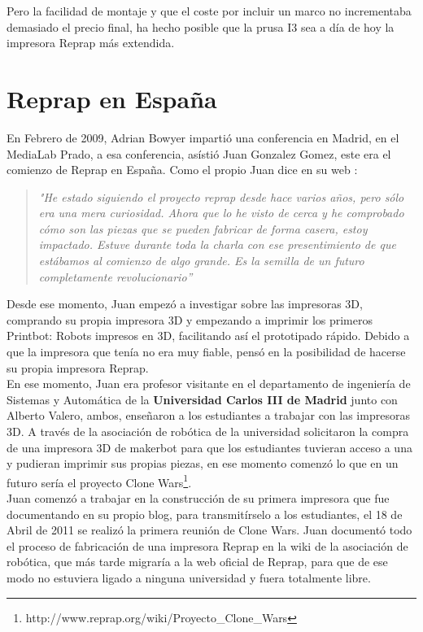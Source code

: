 Pero la facilidad de montaje y que el coste por incluir un marco no incrementaba demasiado el precio final, ha hecho posible que la prusa I3 sea a día de hoy la impresora Reprap más extendida.

\section{Reprap en España}

En Febrero de 2009, Adrian Bowyer impartió una conferencia en Madrid, en el MediaLab Prado, a esa conferencia, asístió Juan Gonzalez Gomez, este era el comienzo de Reprap en España. Como el propio Juan dice en su web \cite{juan1}:

\begin{quotation}
    \emph{
    "He estado siguiendo el proyecto reprap desde hace varios años, pero sólo era una mera curiosidad. Ahora que lo he visto de cerca y he comprobado cómo son las piezas que se pueden fabricar de forma casera, estoy impactado. Estuve durante toda la charla con ese presentimiento de que estábamos al comienzo de algo grande. Es la semilla de un futuro completamente revolucionario”}
\end{quotation}

Desde ese momento, Juan empezó a investigar sobre las impresoras 3D, comprando su propia impresora 3D \cite{juanR1} y empezando a imprimir los primeros Printbot: Robots impresos en 3D, facilitando así el prototipado rápido. Debido a que la impresora que tenía no era muy fiable, pensó en la posibilidad de hacerse su propia impresora Reprap.\\

En ese momento, Juan era profesor visitante en el departamento de ingeniería de Sistemas y Automática de la \textbf{Universidad Carlos III de Madrid} junto con Alberto Valero, ambos, enseñaron a los estudiantes a trabajar con las impresoras 3D. A través de la asociación de robótica de la universidad solicitaron la compra de una impresora 3D de makerbot para que los estudiantes tuvieran acceso a una y pudieran imprimir sus propias piezas, en ese momento comenzó lo que en un futuro sería el proyecto Clone Wars\footnote{http://www.reprap.org/wiki/Proyecto\_Clone\_Wars}.\\


Juan comenzó a trabajar en la construcción de su primera impresora que fue documentando en su propio blog, para transmitírselo a los estudiantes, el 18 de Abril de 2011 se realizó la primera reunión de Clone Wars. Juan documentó todo el proceso de fabricación de una impresora Reprap en la wiki de la asociación de robótica, que más tarde migraría a la web oficial de Reprap, para que de ese modo no estuviera ligado a ninguna universidad y fuera totalmente libre.\\




